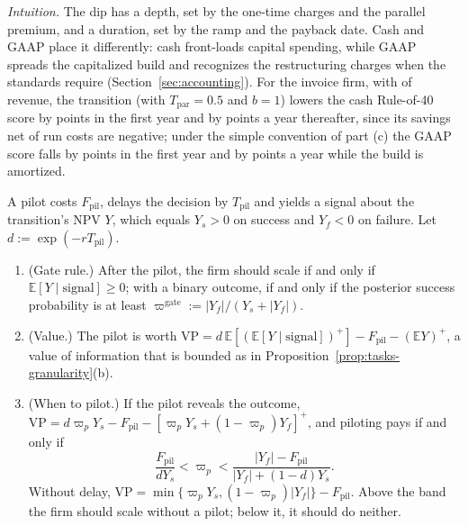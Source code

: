 \noindent\emph{Intuition.} The dip has a depth, set by the one-time charges and the parallel premium, and a duration, set by the ramp and the payback date. Cash and GAAP place it differently: cash front-loads capital spending, while GAAP spreads the capitalized build and recognizes the restructuring charges when the standards require (Section~\ref{sec:accounting}). For the invoice firm, with \icRevenue{} of revenue, the transition (with $T_{\mathrm{par}}=0.5$ and $b=1$) lowers the cash Rule-of-40 score by \icSPcashOne{} points in the first year and by \icSPcashLater{} points a year thereafter, since its savings net of run costs are negative; under the simple convention of part (c) the GAAP score falls by \icSPgaapOne{} points in the first year and by \icSPgaapLater{} points a year while the build is amortized.

\begin{proposition}\label{prop:tasks-pilot}
A pilot costs $F_{\mathrm{pil}}$, delays the decision by $T_{\mathrm{pil}}$ and yields a signal about the transition's NPV $Y$, which equals $Y_s>0$ on success and $Y_f<0$ on failure. Let $d:=\exp(-rT_{\mathrm{pil}})$.
\begin{enumerate}
\item[(a)] (Gate rule.) After the pilot, the firm should scale if and only if $\mathbb E[Y\mid\text{signal}]\ge 0$; with a binary outcome, if and only if the posterior success probability is at least $\varpi^{\mathrm{gate}}:=|Y_f|/(Y_s+|Y_f|)$.
\item[(b)] (Value.) The pilot is worth $\mathrm{VP}=d\,\mathbb E[(\mathbb E[Y\mid\text{signal}])^+]-F_{\mathrm{pil}}-(\mathbb E Y)^+$, a value of information that is bounded as in Proposition~\ref{prop:tasks-granularity}(b).
\item[(c)] (When to pilot.) If the pilot reveals the outcome, $\mathrm{VP}=d\varpi_pY_s-F_{\mathrm{pil}}-[\varpi_pY_s+(1-\varpi_p)Y_f]^+$, and piloting pays if and only if
\begin{equation}\label{eq:tasks-pilotband}
\frac{F_{\mathrm{pil}}}{dY_s}<\varpi_p<\frac{|Y_f|-F_{\mathrm{pil}}}{|Y_f|+(1-d)Y_s}.
\end{equation}
Without delay, $\mathrm{VP}=\min\{\varpi_pY_s,(1-\varpi_p)|Y_f|\}-F_{\mathrm{pil}}$. Above the band the firm should scale without a pilot; below it, it should do neither.
\end{enumerate}
\end{proposition}


